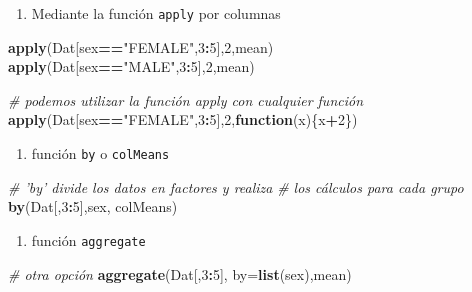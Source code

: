 \documentclass[]{book}
\newenvironment{Shaded}{\begin{snugshade}}{\end{snugshade}}
\newcommand{\KeywordTok}[1]{\textcolor[rgb]{0.13,0.29,0.53}{\textbf{#1}}}
\newcommand{\DataTypeTok}[1]{\textcolor[rgb]{0.13,0.29,0.53}{#1}}
\newcommand{\DecValTok}[1]{\textcolor[rgb]{0.00,0.00,0.81}{#1}}
\newcommand{\StringTok}[1]{\textcolor[rgb]{0.31,0.60,0.02}{#1}}
\newcommand{\CommentTok}[1]{\textcolor[rgb]{0.56,0.35,0.01}{\textit{#1}}}
\newcommand{\ControlFlowTok}[1]{\textcolor[rgb]{0.13,0.29,0.53}{\textbf{#1}}}
\newcommand{\OperatorTok}[1]{\textcolor[rgb]{0.81,0.36,0.00}{\textbf{#1}}}
\newcommand{\NormalTok}[1]{#1}
\providecommand{\tightlist}{%
  \setlength{\itemsep}{0pt}\setlength{\parskip}{0pt}}
\begin{document}
\begin{enumerate}
\def\labelenumi{\arabic{enumi}.}
\setcounter{enumi}{1}
\tightlist
\item
  Mediante la función \texttt{apply} por columnas
\end{enumerate}

\begin{Shaded}
\begin{Highlighting}[]
\KeywordTok{apply}\NormalTok{(Dat[sex}\OperatorTok{==}\StringTok{"FEMALE"}\NormalTok{,}\DecValTok{3}\OperatorTok{:}\DecValTok{5}\NormalTok{],}\DecValTok{2}\NormalTok{,mean)}
\KeywordTok{apply}\NormalTok{(Dat[sex}\OperatorTok{==}\StringTok{"MALE"}\NormalTok{,}\DecValTok{3}\OperatorTok{:}\DecValTok{5}\NormalTok{],}\DecValTok{2}\NormalTok{,mean)}

\CommentTok{# podemos utilizar la función apply con cualquier función}
\KeywordTok{apply}\NormalTok{(Dat[sex}\OperatorTok{==}\StringTok{"FEMALE"}\NormalTok{,}\DecValTok{3}\OperatorTok{:}\DecValTok{5}\NormalTok{],}\DecValTok{2}\NormalTok{,}\ControlFlowTok{function}\NormalTok{(x)\{x}\OperatorTok{+}\DecValTok{2}\NormalTok{\})}
\end{Highlighting}
\end{Shaded}

\begin{enumerate}
\def\labelenumi{\arabic{enumi}.}
\setcounter{enumi}{2}
\tightlist
\item
  función \texttt{by} o \texttt{colMeans}
\end{enumerate}

\begin{Shaded}
\begin{Highlighting}[]
\CommentTok{# 'by' divide los datos en factores y realiza }
\CommentTok{#   los cálculos para cada grupo}
\KeywordTok{by}\NormalTok{(Dat[,}\DecValTok{3}\OperatorTok{:}\DecValTok{5}\NormalTok{],sex, colMeans) }
\end{Highlighting}
\end{Shaded}

\begin{enumerate}
\def\labelenumi{\arabic{enumi}.}
\setcounter{enumi}{3}
\tightlist
\item
  función \texttt{aggregate}
\end{enumerate}

\begin{Shaded}
\begin{Highlighting}[]
\CommentTok{# otra opción}
\KeywordTok{aggregate}\NormalTok{(Dat[,}\DecValTok{3}\OperatorTok{:}\DecValTok{5}\NormalTok{], }\DataTypeTok{by=}\KeywordTok{list}\NormalTok{(sex),mean) }
\end{Highlighting}
\end{Shaded}
\end{document}

